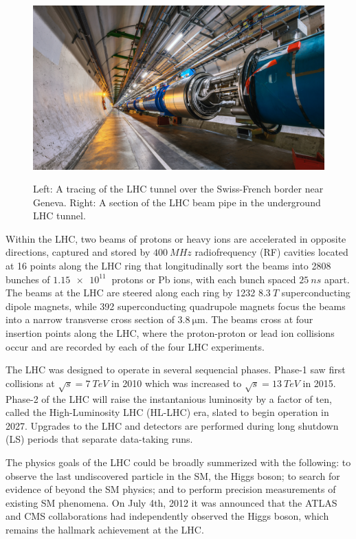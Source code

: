 \begin{figure}[H]
{    \includegraphics[height=\textwidth]{Images/CMS/LHCpipe.jpg}
    }
    \caption{Left: A tracing of the LHC tunnel over the Swiss-French border near Geneva. Right: A section of the LHC beam pipe in the underground LHC tunnel.}
    \label{fig:LHC}
\end{figure}

Within the LHC, two beams of protons or heavy ions are accelerated in opposite directions, captured and stored by $\SI{400}{MHz}$ radiofrequency (RF) cavities located at 16 points along the LHC ring that longitudinally sort the beams into 2808 bunches of $\SI{1.15e11}{}$ protons or Pb ions, with each bunch spaced $\SI{25}{ns}$ apart. The beams at the LHC are steered along each ring by 1232 $\SI{8.3}{T}$ superconducting dipole magnets, while 392 superconducting quadrupole magnets focus the beams into a narrow transverse cross section of $\SI{3.8}{\micro\meter}$. The beams cross at four insertion points along the LHC, where the proton-proton or lead ion collisions occur and are recorded by each of the four LHC experiments.

The LHC was designed to operate in several sequencial phases. Phase-1 saw first collisions at $\sqrt{s}=\SI{7}{TeV}$ in 2010 which was increased to $\sqrt{s}=\SI{13}{TeV}$ in 2015. Phase-2 of the LHC will raise the instantanious luminosity by a factor of ten, called the High-Luminosity LHC (HL-LHC) era, slated to begin operation in 2027. Upgrades to the LHC and detectors are performed during long shutdown (LS) periods that separate data-taking runs.

The physics goals of the LHC could be broadly summerized with the following: to observe the last undiscovered particle in the SM, the Higgs boson; to search for evidence of beyond the SM physics; and to perform precision measurements of existing SM phenomena. On July 4th, 2012 it was announced that the ATLAS and CMS collaborations had independently observed the Higgs boson, which remains the hallmark achievement at the LHC.